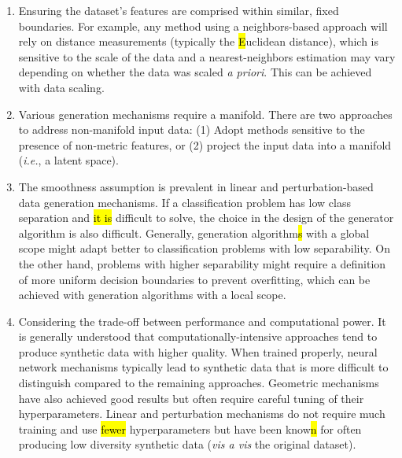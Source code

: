 \begin{enumerate}

    \item Ensuring the dataset's features are comprised within similar, fixed
        boundaries. For example, any method using a neighbors-based approach
        will rely on distance measurements (typically the \hl{E}uclidean distance),
        which is sensitive to the scale of the data and a nearest-neighbors
        estimation may vary depending on whether the data was scaled \textit{a
        priori}. This can be achieved with data scaling. 

    \item Various generation mechanisms require a manifold. There are two
        approaches to address non-manifold input data: (1) Adopt methods
        sensitive to the presence of non-metric features, or (2) project the
        input data into a manifold (\textit{i.e.}, a latent space).

    \item The smoothness assumption is prevalent in linear and
        perturbation-based data generation mechanisms. If a classification
        problem has low class separation and \hl{it is }difficult to solve, the choice in
        the design of the generator algorithm is also difficult. Generally,
        generation algorithm\hl{s} with a global scope might adapt better to
        classification problems with low separability. On the other hand,
        problems with higher separability might require a definition of more
        uniform decision boundaries to prevent overfitting, which can be
        achieved with generation algorithms with a local scope.

    \item Considering the trade-off between performance and computational
        power. It is generally understood that computationally-intensive
        approaches tend to produce synthetic data with higher quality. When
        trained properly, neural network mechanisms typically lead to
        synthetic data that is more difficult to distinguish compared to the
        remaining approaches. Geometric mechanisms have also achieved good
        results but often require\hl{ }careful tuning of their hyperparameters.
        Linear and perturbation mechanisms do not require much training and
        use \hl{fewer} hyperparameters but have been know\hl{n} for often producing low
        diversity synthetic data (\textit{vis a vis} the original dataset).

\end{enumerate}

